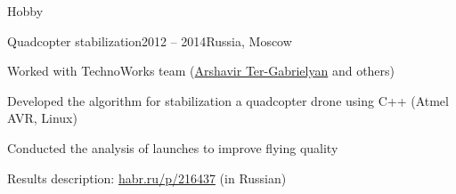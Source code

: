 \documentclass{resume} %
\begin{document}
\begin{rSection}{Hobby}
\begin{rSubsection}{Quadcopter stabilization}{2012 -- 2014}{}{Russia, Moscow}
\item Worked with TechnoWorks team (\href{http://www.pm.inf.ethz.ch/people/person-detail.html?persid=220074}{Arshavir Ter-Gabrielyan} and others)
\item Developed the algorithm for stabilization a quadcopter drone using C++ (Atmel AVR, Linux)
\item Conducted the analysis of launches to improve flying quality
\item Results description: \url{habr.ru/p/216437} (in Russian)
\end{rSubsection}

\end{rSection}

\end{document}
